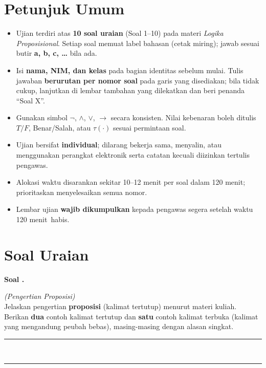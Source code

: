 \documentclass[12pt,a4paper]{article}
\newcommand{\WaktuUjian}{120 menit}
\newcounter{soaluts}
\newcommand{\soaluts}{%
  \refstepcounter{soaluts}%
  \par\vspace{0.8ex plus 0.15ex}%
  \noindent\textbf{Soal \thesoaluts.}\quad
}
\newcommand{\ruangjawaban}[1][6cm]{%
  \par\vspace{0.4em}%
  \noindent\rule{\linewidth}{0.4pt}\\[0.35em]%
  \rule{\linewidth}{0.4pt}\\[0.35em]%
  \ifdim#1>6cm\rule{\linewidth}{0.4pt}\\[0.35em]\fi
  \ifdim#1>8cm\rule{\linewidth}{0.4pt}\\[0.35em]\fi
  \par\vspace{0.7em}%
}
\begin{document}
\section*{Petunjuk Umum}
\begin{itemize}[leftmargin=*, itemsep=0.25em]
  \item Ujian terdiri atas \textbf{10 soal uraian} (Soal 1--10) pada materi \textit{Logika Proposisional}. Setiap soal memuat label bahasan (cetak miring); jawab sesuai butir \textbf{a, b, c, \ldots} bila ada.
  \item Isi \textbf{nama, NIM, dan kelas} pada bagian identitas sebelum mulai. Tulis jawaban \textbf{berurutan per nomor soal} pada garis yang disediakan; bila tidak cukup, lanjutkan di lembar tambahan yang dilekatkan dan beri penanda ``Soal X''.
  \item Gunakan simbol \(\neg\), \(\wedge\), \(\vee\), \(\rightarrow\) secara konsisten. Nilai kebenaran boleh ditulis \(T/F\), Benar/Salah, atau \(\tau(\cdot)\) sesuai permintaan soal.
  \item Ujian bersifat \textbf{individual}; dilarang bekerja sama, menyalin, atau menggunakan perangkat elektronik serta catatan kecuali diizinkan tertulis pengawas.
  \item Alokasi waktu disarankan sekitar 10--12 menit per soal dalam \WaktuUjian; prioritaskan menyelesaikan semua nomor.
  \item Lembar ujian \textbf{wajib dikumpulkan} kepada pengawas segera setelah waktu \WaktuUjian\ habis.
\end{itemize}

\section*{Soal Uraian}

\soaluts
\textit{(Pengertian Proposisi)}\\
Jelaskan pengertian \textbf{proposisi} (kalimat tertutup) menurut materi kuliah. Berikan \textbf{dua} contoh kalimat tertutup dan \textbf{satu} contoh kalimat terbuka (kalimat yang mengandung peubah bebas), masing-masing dengan alasan singkat.
\ruangjawaban[7cm]
\end{document}
